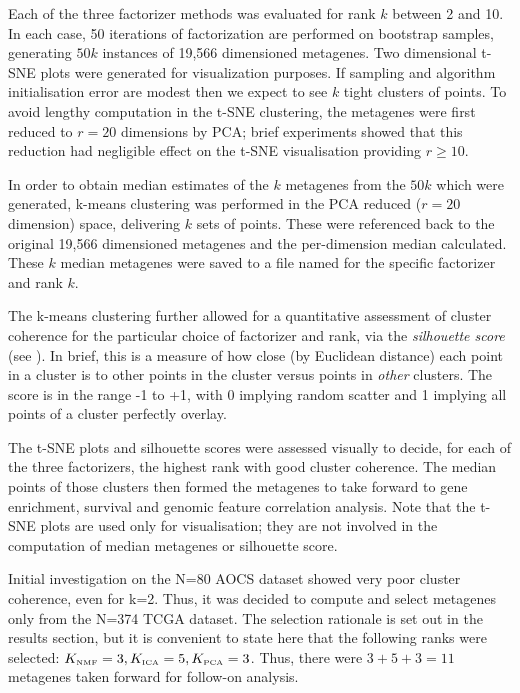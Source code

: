 \documentclass[tikz, 12pt,a4paper,oneside,fleqn]{article}
\begin{document}
Each of the three factorizer methods was evaluated for rank $k$ between 2 and 10.  In each case, 50 iterations of factorization are performed on bootstrap samples, generating $50 k$ instances of 19,566 dimensioned metagenes.  Two dimensional t-SNE plots were generated for visualization purposes.   If sampling and algorithm initialisation error are modest then we expect to see $k$ tight clusters of points.   To avoid lengthy computation in the t-SNE clustering, the metagenes were first reduced to $r=20$ dimensions by PCA; brief experiments showed that this reduction had negligible effect on the t-SNE visualisation providing $r \geq 10$.   

In order to obtain median estimates of the $k$ metagenes from the $50 k$ which were generated, k-means clustering was performed in the PCA reduced ($r=20$ dimension) space, delivering $k$ sets of points.  These were referenced back to the original 19,566 dimensioned metagenes and the per-dimension median calculated.  These $k$ median metagenes were saved to a file named for the specific factorizer and rank $k$.  

The k-means clustering further allowed for a quantitative assessment of cluster coherence for the particular choice of factorizer and rank, via the \emph{silhouette score} (see \cite{Wikipedia}).  In brief, this is a measure of how close (by Euclidean distance) each point in a cluster is to other points in the cluster versus points in \emph{other} clusters.  
The score is in the range -1 to +1, with 0 implying random scatter and 1 implying all points of a cluster perfectly overlay.

The t-SNE plots and silhouette scores were assessed visually to decide, for each of the three factorizers, the highest rank with good cluster coherence.  The median points of those clusters then formed the metagenes to take forward to gene enrichment, survival and genomic feature correlation analysis.   
Note that the t-SNE plots are used only for visualisation; they are not involved in the computation of median metagenes or silhouette score.

Initial investigation on the N=80 AOCS dataset showed very poor cluster coherence, even for k=2.   Thus, it was decided to compute and select metagenes only from the N=374 TCGA dataset.   
The selection rationale is set out in the results section, but it is convenient to state here that the following ranks were selected:
$K_{\mbox{\tiny NMF}} = 3, K_{\mbox{\tiny ICA}} = 5, K_{\mbox{\tiny PCA}} =3$.  Thus, there were $3 + 5 + 3 = 11$ metagenes taken forward for follow-on analysis.
\end{document}
